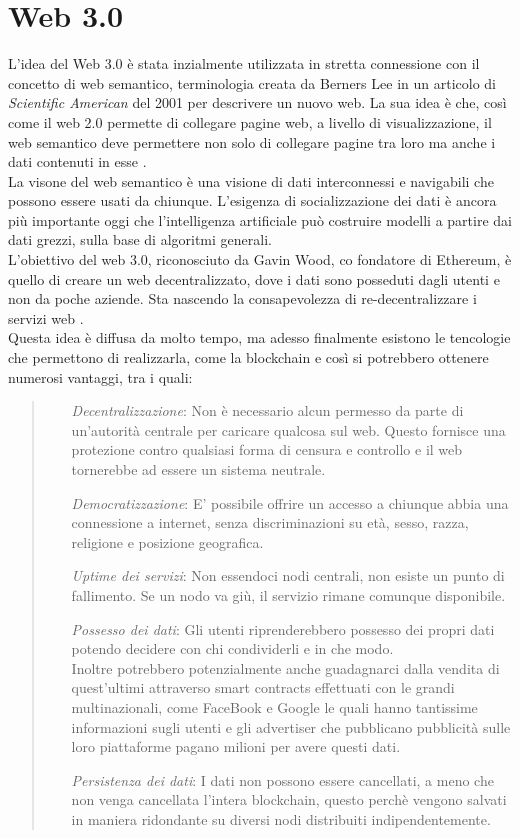 \section{Web 3.0}
L'idea del Web 3.0 è stata inzialmente utilizzata in stretta connessione con il concetto di web semantico, terminologia creata da Berners Lee in un articolo di \textit{Scientific American} del 2001 per descrivere un nuovo web. 
La sua idea è che, così come il web 2.0 permette di collegare pagine web, a livello di visualizzazione, il web semantico deve permettere non solo di collegare pagine tra loro ma anche i dati contenuti in esse \cite{ted_youtube}.
\\La visone del web semantico è una visione di dati interconnessi e navigabili che possono essere usati da chiunque. L'esigenza di socializzazione dei dati è ancora più importante oggi che l'intelligenza artificiale può costruire modelli a partire dai dati grezzi, sulla base di algoritmi generali.
\\L'obiettivo del web 3.0, riconosciuto da Gavin Wood, co fondatore di Ethereum, è quello di creare un web decentralizzato, dove i dati sono posseduti dagli utenti e non da poche aziende. Sta nascendo la consapevolezza di re-decentralizzare i servizi web \cite{Blockchain_tecnologia_e_applicazioni_per_il_business}.
\\Questa idea è diffusa da molto tempo, ma adesso finalmente esistono le tencologie che permettono di realizzarla, come la blockchain 
e così si potrebbero ottenere numerosi vantaggi, tra i quali:
\begin{quote}
    \begin{itemize}
        \item [\textit{Decentralizzazione}:] Non è necessario alcun permesso da parte di un'autorità centrale per caricare qualcosa sul web. Questo fornisce una protezione contro qualsiasi forma di censura e controllo e il web tornerebbe ad essere un sistema neutrale.
        \item [\textit{Democratizzazione}:] E' possibile offrire un accesso a chiunque abbia una connessione a internet, senza discriminazioni su età, sesso, razza, religione e posizione geografica.
        \item [\textit{Uptime dei servizi}:] Non essendoci nodi centrali, non esiste un punto di fallimento. Se un nodo va giù, il servizio rimane comunque disponibile.
        \item [\textit{Possesso dei dati}:] Gli utenti riprenderebbero possesso dei propri dati potendo decidere con chi condividerli e in che modo. 
        \\Inoltre potrebbero potenzialmente anche guadagnarci dalla vendita di quest'ultimi attraverso smart contracts effettuati con le grandi multinazionali, come FaceBook e Google le quali hanno tantissime informazioni sugli utenti e gli advertiser che pubblicano pubblicità sulle loro piattaforme pagano milioni per avere questi dati.
        \item [\textit{Persistenza dei dati}:] I dati non possono essere cancellati, a meno che non venga cancellata l'intera blockchain, questo perchè vengono salvati in maniera ridondante su diversi nodi distribuiti indipendentemente.
    \end{itemize}
    \end{quote}
